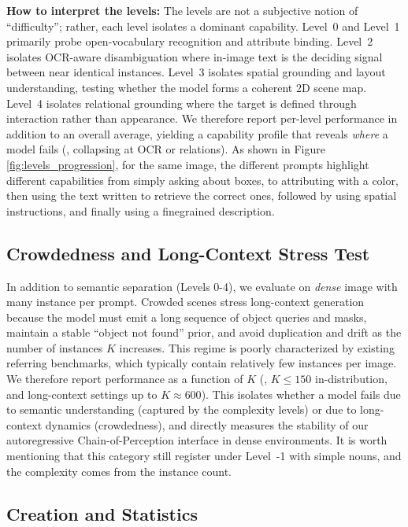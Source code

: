 \noindent \textbf{How to interpret the levels:} The levels are not a subjective notion of ``difficulty''; rather, each level isolates a dominant capability. Level~0 and Level~1 primarily probe open-vocabulary recognition and attribute binding. Level~2 isolates OCR-aware disambiguation where in-image text is the deciding signal between near identical instances. Level~3 isolates spatial grounding and layout understanding, testing whether the model forms a coherent 2D scene map. Level~4 isolates relational grounding where the target is defined through interaction rather than appearance. We therefore report per-level performance in addition to an overall average, yielding a capability profile that reveals \emph{where} a model fails (\eg, collapsing at OCR or relations). As shown in Figure \ref{fig:levels_progression}, for the same image, the different prompts highlight different capabilities from simply asking about boxes, to attributing with a color, then using the text written to retrieve the correct ones, followed by using spatial instructions, and finally using a finegrained description.\\

\subsection{Crowdedness and Long-Context Stress Test}
\label{sec:dense_stress}

In addition to semantic separation (Levels 0-4), we evaluate on \emph{dense} image with many instance per prompt. Crowded scenes stress long-context generation because the model must emit a long sequence of object queries and masks, maintain a stable ``object not found'' prior, and avoid duplication and drift as the number of instances $K$ increases. This regime is poorly characterized by existing referring benchmarks, which typically contain relatively few instances per image. We therefore report performance as a function of $K$ (\eg, $K \le 150$ in-distribution, and long-context settings up to $K \approx 600$). This isolates whether a model fails due to semantic understanding (captured by the complexity levels) or due to long-context dynamics (crowdedness), and directly measures the stability of our autoregressive Chain-of-Perception interface in dense environments. It is worth mentioning that this category still register under Level~-1 with simple nouns, and the complexity comes from the instance count.

\subsection{Creation and Statistics}
\label{sec:benchmark_construction}

